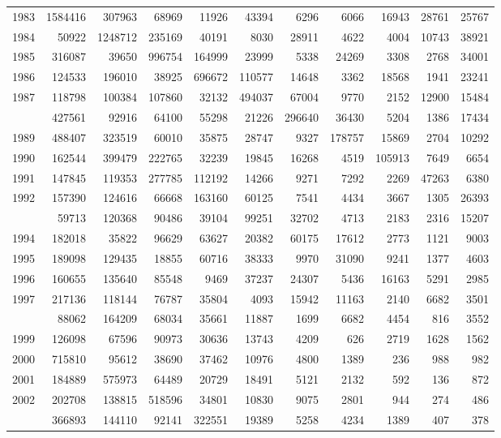 \documentclass[
]{article}
\begin{document}
\begin{longtable}[t]{lrrrrrrrrrr}
1983 & 1584416 & 307963 & 68969 & 11926 & 43394 & 6296 & 6066 & 16943 & 28761 & 25767\\
1984 & 50922 & 1248712 & 235169 & 40191 & 8030 & 28911 & 4622 & 4004 & 10743 & 38921\\
1985 & 316087 & 39650 & 996754 & 164999 & 23999 & 5338 & 24269 & 3308 & 2768 & 34001\\
1986 & 124533 & 196010 & 38925 & 696672 & 110577 & 14648 & 3362 & 18568 & 1941 & 23241\\
1987 & 118798 & 100384 & 107860 & 32132 & 494037 & 67004 & 9770 & 2152 & 12900 & 15484\\
\addlinespace
1988 & 427561 & 92916 & 64100 & 55298 & 21226 & 296640 & 36430 & 5204 & 1386 & 17434\\
1989 & 488407 & 323519 & 60010 & 35875 & 28747 & 9327 & 178757 & 15869 & 2704 & 10292\\
1990 & 162544 & 399479 & 222765 & 32239 & 19845 & 16268 & 4519 & 105913 & 7649 & 6654\\
1991 & 147845 & 119353 & 277785 & 112192 & 14266 & 9271 & 7292 & 2269 & 47263 & 6380\\
1992 & 157390 & 124616 & 66668 & 163160 & 60125 & 7541 & 4434 & 3667 & 1305 & 26393\\
\addlinespace
1993 & 59713 & 120368 & 90486 & 39104 & 99251 & 32702 & 4713 & 2183 & 2316 & 15207\\
1994 & 182018 & 35822 & 96629 & 63627 & 20382 & 60175 & 17612 & 2773 & 1121 & 9003\\
1995 & 189098 & 129435 & 18855 & 60716 & 38333 & 9970 & 31090 & 9241 & 1377 & 4603\\
1996 & 160655 & 135640 & 85548 & 9469 & 37237 & 24307 & 5436 & 16163 & 5291 & 2985\\
1997 & 217136 & 118144 & 76787 & 35804 & 4093 & 15942 & 11163 & 2140 & 6682 & 3501\\
\addlinespace
1998 & 88062 & 164209 & 68034 & 35661 & 11887 & 1699 & 6682 & 4454 & 816 & 3552\\
1999 & 126098 & 67596 & 90973 & 30636 & 13743 & 4209 & 626 & 2719 & 1628 & 1562\\
2000 & 715810 & 95612 & 38690 & 37462 & 10976 & 4800 & 1389 & 236 & 988 & 982\\
2001 & 184889 & 575973 & 64489 & 20729 & 18491 & 5121 & 2132 & 592 & 136 & 872\\
2002 & 202708 & 138815 & 518596 & 34801 & 10830 & 9075 & 2801 & 944 & 274 & 486\\
\addlinespace
2003 & 366893 & 144110 & 92141 & 322551 & 19389 & 5258 & 4234 & 1389 & 407 & 378\\

\end{longtable}
\end{document}
